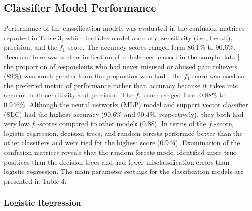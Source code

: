 \documentclass[sigconf]{acmart}
\begin{document}

\subsection{Classifier Model Performance}

Performance of the classification models was evaluated in the confusion 
matrices reported in Table 3, which includes model accuracy, sensitivity 
(i.e., Recall), precision, and the $f_1$-score. The accuracy scores
ranged form 86.1\% to 90.6\%. Because there was a clear indication of 
unbalanced classes in the sample data | the proportion of respondents who 
had never misused or abused pain relievers (89\%) was much greater than 
the proportion who had | the $f_1$-score was used as the preferred metric 
of performance rather than accuracy because it takes into account both 
sensitivity and precision. The $f_1$-score ranged form 0.88\% to 0.946\%.
Although the neural networks (MLP) model and support vector classifier 
(SLC) had the highest accuracy (90.6\% and 90.4\%, respectively), they 
both had very low $f_1$-scores compared to other models (0.88). In terms 
of the $f_1$-score, logistic regression, decision trees, and random forests 
performed better than the other classifiers and were tied for the highest 
score (0.946). Examination of the confusion matrices reveals that the 
random forests model identified more true positives than the decision 
trees and had fewer misclassification errors than logistic regression. 
The main parameter settings for the classification models are presented 
in Table 4.


\subsubsection{Logistic Regression}
\end{document}
